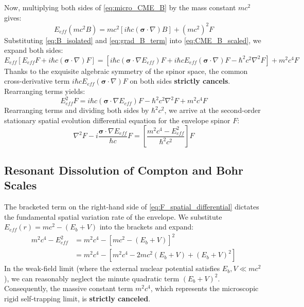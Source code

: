 \documentclass[12pt, a4paper]{article}
\begin{document}
Now, multiplying both sides of \eqref{eq:micro_CME_B} by the mass constant $mc^2$ gives:
\begin{equation}
    E_{eff} (mc^2 B) = mc^2 [i\hbar c (\boldsymbol{\sigma} \cdot \nabla) B] + (mc^2)^2 F \label{eq:CME_B_scaled}
\end{equation}
Substituting \eqref{eq:B_isolated} and \eqref{eq:grad_B_term} into \eqref{eq:CME_B_scaled}, we expand both sides:
\begin{equation}
    E_{eff} \left[ E_{eff} F + i\hbar c (\boldsymbol{\sigma} \cdot \nabla) F \right] = \left[ i\hbar c (\boldsymbol{\sigma} \cdot \nabla E_{eff}) F + i\hbar c E_{eff} (\boldsymbol{\sigma} \cdot \nabla) F - \hbar^2 c^2 \nabla^2 F \right] + m^2 c^4 F
\end{equation}
Thanks to the exquisite algebraic symmetry of the spinor space, the common cross-derivative term $i\hbar c E_{eff} (\boldsymbol{\sigma} \cdot \nabla) F$ on both sides \textbf{strictly cancels}. Rearranging terms yields:
\begin{equation}
    E_{eff}^2 F = i\hbar c (\boldsymbol{\sigma} \cdot \nabla E_{eff}) F - \hbar^2 c^2 \nabla^2 F + m^2 c^4 F
\end{equation}
Rearranging terms and dividing both sides by $\hbar^2 c^2$, we arrive at the second-order stationary spatial evolution differential equation for the envelope spinor $F$:
\begin{equation}
    \nabla^2 F - i\frac{\boldsymbol{\sigma} \cdot \nabla E_{eff}}{\hbar c} F = \left[ \frac{m^2 c^4 - E_{eff}^2}{\hbar^2 c^2} \right] F \label{eq:F_spatial_differential}
\end{equation}

\subsection{Resonant Dissolution of Compton and Bohr Scales}

The bracketed term on the right-hand side of \eqref{eq:F_spatial_differential} dictates the fundamental spatial variation rate of the envelope. We substitute $E_{eff}(r) = mc^2 - (E_b + V)$ into the brackets and expand:
\begin{align}
    m^2 c^4 - E_{eff}^2 &= m^2 c^4 - \left[ mc^2 - (E_b + V) \right]^2 \\
    &= m^2 c^4 - \left[ m^2 c^4 - 2mc^2(E_b + V) + (E_b + V)^2 \right]
\end{align}
In the weak-field limit (where the external nuclear potential satisfies $E_b, V \ll mc^2$), we can reasonably neglect the minute quadratic term $(E_b+V)^2$. Consequently, the massive constant term $m^2 c^4$, which represents the microscopic rigid self-trapping limit, is \textbf{strictly canceled}.
\end{document}
